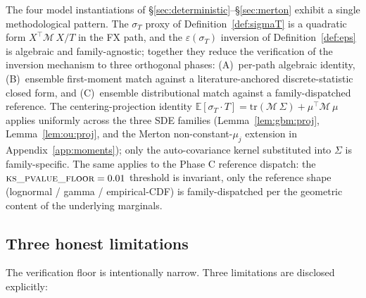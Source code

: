 \documentclass[11pt,letterpaper]{article}
\newcommand{\E}{\mathbb{E}}
\newcommand{\sigmaT}{\sigma_{T}}
\newcommand{\epsT}{\varepsilon(\sigmaT)}
\newcommand{\centerProj}{\mathcal{M}}
\begin{document}
The four model instantiations of \S\ref{sec:deterministic}--\S\ref{sec:merton}
exhibit a single methodological pattern. The $\sigmaT$ proxy of
Definition~\ref{def:sigmaT} is a quadratic form $X^{\top}\centerProj\,X / T$
in the FX path, and the $\epsT$ inversion of Definition~\ref{def:eps}
is algebraic and family-agnostic; together they reduce the verification
of the inversion mechanism to three orthogonal phases:
(A)~per-path algebraic identity, (B)~ensemble first-moment match against
a literature-anchored discrete-statistic closed form, and (C)~ensemble
distributional match against a family-dispatched reference.
The centering-projection identity
$\E[\sigmaT \cdot T] = \mathrm{tr}(\centerProj\,\Sigma)
+ \mu^{\top}\centerProj\,\mu$
applies uniformly across the three SDE families
(Lemma~\ref{lem:gbm:proj}, Lemma~\ref{lem:ou:proj}, and the Merton
non-constant-$\mu_{j}$ extension in Appendix~\ref{app:moments}); only
the auto-covariance kernel substituted into $\Sigma$ is
family-specific. The same applies to the Phase C reference dispatch:
the $\textsc{ks\_pvalue\_floor} = 0.01$ threshold is invariant, only
the reference shape (lognormal / gamma / empirical-CDF) is
family-dispatched per the geometric content of the underlying marginals.

\subsection{Three honest limitations}
\label{sec:discussion:limits}

The verification floor is intentionally narrow. Three limitations are
disclosed explicitly:
\end{document}
